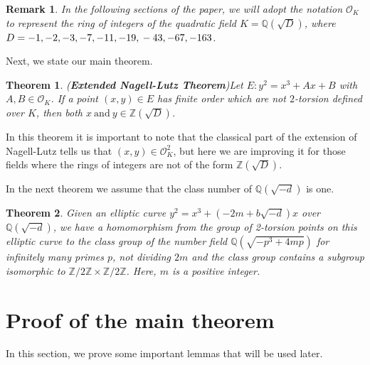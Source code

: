 \documentclass[12pt,leqno]{amsart}
\newcommand{\<}{\langle}
\renewcommand{\>}{\rangle}
\newtheorem{theorem}{Theorem}
\newtheorem{rmk}{Remark}
\theoremstyle{definition}
\numberwithin{equation}{section}
\begin{document}
\begin{rmk}
    In the following sections of the paper, we will adopt the notation $\mathcal{O}_K$ to represent the ring of integers of the quadratic field $K=\mathbb Q(\sqrt{D})$, where $D=-1, -2, -3, -7, -11, -19,\\ -43, -67, -163$.
\end{rmk}

Next, we state our main theorem.
\begin{theorem}(\textbf{Extended Nagell-Lutz Theorem})\label{main thm}
Let $E:y^2=x^3+Ax+B$ with $A,B\in \mathcal{O}_K$. If a point $(x,y)\in E$ has finite order which are not $2$-torsion defined over $K$, then both $x~\text{and}~y\in \mathbb Z(\sqrt{D})$.
\end{theorem}

In this theorem it is important to note that the classical part of the extension of Nagell-Lutz tells us that $(x,y)\in \mathcal{O}_K^2$, but here we are improving it for those fields where the rings of integers are not of the form $\mathbb{Z}(\sqrt{D})$.

In the next theorem we assume that the class number of $\mathbb Q(\sqrt{-d})$ is one. 

\begin{theorem}
Given an elliptic curve $y^2=x^3+(-2m+b\sqrt{-d})x$ over $\mathbb Q(\sqrt{-d})$, we have a homomorphism from the group of 2-torsion points on this elliptic curve to the class group of the number field $\mathbb Q(\sqrt{-p^3+4mp})$ for infinitely many primes $p$, not dividing $2m$ and the class group contains a subgroup isomorphic to $\mathbb Z/2\mathbb Z\times \mathbb Z/2\mathbb Z$. Here, $m$ is a positive integer.
\end{theorem}



\section{Proof of the main theorem}

 In this section, we prove some important lemmas that will be used later.
\end{document}
